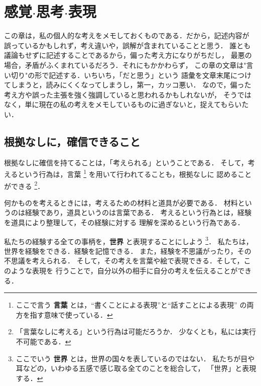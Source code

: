 ﻿%
\chapter{感覚$\cdot$思考$\cdot$表現}
    \begin{mycomment}
        この章は，私の個人的な考えをメモしておくものである．だから，記述内容が
        誤っているかもしれず，考え違いや，誤解が含まれていることと思う．
        誰とも議論もせずに記述することであるから，偏った考え方になりがちだし，
        最悪の場合，矛盾がふくまれているだろう．それにもかかわらず，
        この章の文章は"言い切り"の形で記述する．いちいち，「だと思う」という
        語彙を文章末尾につけてしまうと，読みにくくなってしまうし，第一，カッコ悪い．
        なので，偏った考え方や誤った主張を強く強調していると思われるかもしれないが，
        そうではなく，単に現在の私の考えをメモしているものに過ぎないと，捉えてもらいたい．
    \end{mycomment}
        \section{根拠なしに，確信できること}
            根拠なしに確信を持てることは，「考えられる」ということである．
            そして，考えるという行為は，言葉
                \footnote{
                    ここで言う \textbf{言葉} とは，“書くことによる表現”と“話すことによる表現”
                    の両方を指す意味で使っている．
                }
            を用いて行われてることも，根拠なしに
            認めることができる
                \footnote{
                    「言葉なしに考える」という行為は可能だろうか．
                    少なくとも，私には実行不可能である．
                }．

            何かものを考えるときには，考えるための材料と道具が必要である．
            材料というのは経験であり，道具というのは言葉である．
            考えるという行為とは，経験を道具により整理して，その経験に対する
            理解を深めるという行為である．

            私たちの経験する全ての事柄を，\textbf{世界} と表現することにしよう
                \footnote{
                    ここでいう \textbf{世界} とは，世界の国々を表しているのではない．
                    私たちが目や耳などの，いわゆる五感で感じ取る全てのことを総合して，
                    「世界」と表現する．
                }．
            私たちは，世界を経験をできる．経験を記憶できる．
            また，経験を不思議がったり，その不思議を考えられる．
            そして，その考えを言葉や絵で表現できる．そして，このような表現を
            行うことで，自分以外の相手に自分の考えを伝えることができる．

